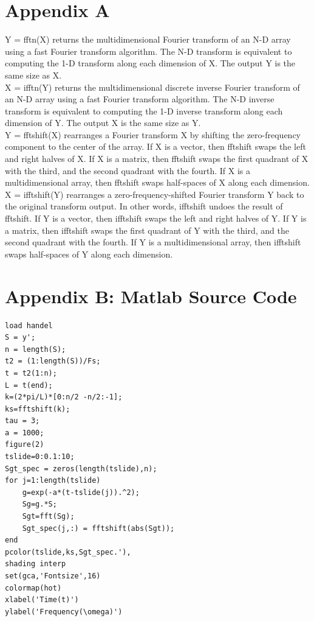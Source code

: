 \documentclass[12pt]{article}
\begin{document}
\section{Appendix A}
Y = fftn(X) returns the multidimensional Fourier transform of an N-D array using a fast Fourier transform algorithm. The N-D transform is equivalent to computing the 1-D transform along each dimension of X. The output Y is the same size as X.\\

X = ifftn(Y) returns the multidimensional discrete inverse Fourier transform of an N-D array using a fast Fourier transform algorithm. The N-D inverse transform is equivalent to computing the 1-D inverse transform along each dimension of Y. The output X is the same size as Y.\\

Y = fftshift(X) rearranges a Fourier transform X by shifting the zero-frequency component to the center of the array.
If X is a vector, then fftshift swaps the left and right halves of X.
If X is a matrix, then fftshift swaps the first quadrant of X with the third, and the second quadrant with the fourth.
If X is a multidimensional array, then fftshift swaps half-spaces of X along each dimension.\\

X = ifftshift(Y) rearranges a zero-frequency-shifted Fourier transform Y back to the original transform output. In other words, ifftshift undoes the result of fftshift.
If Y is a vector, then ifftshift swaps the left and right halves of Y.
If Y is a matrix, then ifftshift swaps the first quadrant of Y with the third, and the second quadrant with the fourth.
If Y is a multidimensional array, then ifftshift swaps half-spaces of Y along each dimension.\\
\section{Appendix B: Matlab Source Code}
\begin{lstlisting}[caption={Generating Spectrogram of Gaussian Kernel}, frame=single]
load handel
S = y';
n = length(S);
t2 = (1:length(S))/Fs;
t = t2(1:n); 
L = t(end);
k=(2*pi/L)*[0:n/2 -n/2:-1]; 
ks=fftshift(k);
tau = 3;
a = 1000;
figure(2)
tslide=0:0.1:10;
Sgt_spec = zeros(length(tslide),n);
for j=1:length(tslide)
    g=exp(-a*(t-tslide(j)).^2); 
    Sg=g.*S; 
    Sgt=fft(Sg); 
    Sgt_spec(j,:) = fftshift(abs(Sgt));
end
pcolor(tslide,ks,Sgt_spec.'), 
shading interp 
set(gca,'Fontsize',16) 
colormap(hot)
xlabel('Time(t)')
ylabel('Frequency(\omega)') 
\end{lstlisting}
\end{document}
